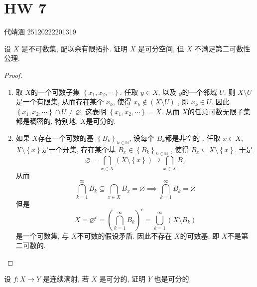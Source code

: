 \documentclass[../main.tex]{subfiles}
\begin{document}
\ifSubfilesClassLoaded{

    
    \setcounter{chapter}{6}
}{}

\chapter{ HW 7 }
 代靖涵 25120222201319
\begin{exercise}{}{}
    设 $X$ 是不可数集, 配以余有限拓扑. 证明 $X$ 是可分空间, 但 $X$ 不满足第二可数性公理.
\end{exercise}

\begin{proof}
   \begin{enumerate}
    \item 取 \(  X  \)的一个可数子集 \(  \left\{ x_1,x_2,\cdots  \right\}  \). 任取 \(  y \in X  \), 以及 \(  y  \)的一个邻域 \(  U  \). 则 \(  X\setminus U  \)是一个有限集, 从而存在某个 \(  x_{k}  \), 使得 \(  x_{k}\not \in \left( X\setminus U \right)   \)        , 即 \(  x_{k}\in U  \).  因此 \(  \left\{ x_1,x_2,\cdots  \right\}\cap U\neq \varnothing  \). 这表明 \(  \overline{\left\{ x_1,x_2,\cdots  \right\}}  = X\). 从而 \(  X  \)的任意可数无限子集都是稠密的, 特别地, \(  X  \)是可分的.    
    \item 如果 \(  X  \)存在一个可数的基 \(  \left\{ B_{k} \right\}_{k \in \mathbb{N} }  \), 设每个 \(  B_{k}  \)都是非空的 . 任取 \(  x \in X  \), \(  X\setminus \left\{ x \right\}  \)是一个开集, 存在某个基 \(  B_{x}  \in \left\{ B_{k} \right\}_{k \in \mathbb{N} }\) , 使得 \(  B_{x}\subseteq X\setminus \left\{ x \right\}  \). 于是 \[
   \varnothing =  \bigcap _{x \in X}\left( X\setminus \left\{ x \right\} \right)\supseteq \bigcap _{x \in X}B_{x}
    \]    从而 \[
    \bigcap _{k = 1}^{\infty}B_{k}\subseteq \bigcap _{x \in X}B_{x}= \varnothing\implies \bigcap _{k= 1}^{\infty}B_{k}= \varnothing
    \]但是 \[
    X= \varnothing^{c}= \left( \bigcap _{k= 1}^{\infty}B_{k} \right)^{c}= \bigcup _{k= 1}^{\infty}\left( X\setminus B_{k} \right)  
    \]是一个可数集, 与 \(  X  \)不可数的假设矛盾. 因此不存在 \(  X  \)的可数基, 即 \(  X  \)不是第二可数的.   
   \end{enumerate}

\end{proof}
\begin{exercise}{}{}
设 $f: X \to Y$ 是连续满射, 若 $X$ 是可分的, 证明 $Y$ 也是可分的.
\end{exercise}
\end{document}
